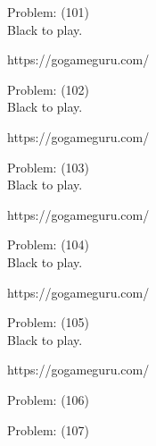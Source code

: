\documentclass[11pt]{article}
\begin{document}
\begin{minipage}[t]{0.5\textwidth}
  {\centering
  
Problem: (101)\\
Black to play.

https://gogameguru.com/\\
  }
\end{minipage}
\begin{minipage}[t]{0.5\textwidth}
  {\centering
  
Problem: (102)\\
Black to play.

https://gogameguru.com/\\
  }
\end{minipage}
\begin{minipage}[t]{0.5\textwidth}
  {\centering
  
Problem: (103)\\
Black to play.

https://gogameguru.com/\\
  }
\end{minipage}
\begin{minipage}[t]{0.5\textwidth}
  {\centering
  
Problem: (104)\\
Black to play.

https://gogameguru.com/\\
  }
\end{minipage}
\begin{minipage}[t]{0.5\textwidth}
  {\centering
  
Problem: (105)\\
Black to play.

https://gogameguru.com/\\
  }
\end{minipage}
\begin{minipage}[t]{0.5\textwidth}
  {\centering
  
Problem: (106)\\
  }
\end{minipage}
\begin{minipage}[t]{0.5\textwidth}
  {\centering
  
Problem: (107)\\
  }
\end{minipage}
\end{document}
